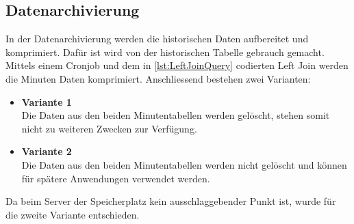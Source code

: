 \subsection{Datenarchivierung}

In der Datenarchivierung werden die historischen Daten aufbereitet und komprimiert. Dafür ist wird von der historischen Tabelle gebrauch gemacht. Mittels einem Cronjob und dem in \ref{lst:LeftJoinQuery} codierten Left Join werden die Minuten Daten komprimiert. Anschliessend bestehen zwei Varianten:\\
\begin{itemize}
\item \textbf{Variante 1}\\
Die Daten aus den beiden Minutentabellen werden gelöscht, stehen somit nicht zu weiteren Zwecken zur Verfügung.
\item \textbf{Variante 2}\\
Die Daten aus den beiden Minutentabellen werden nicht gelöscht und können für spätere Anwendungen verwendet werden.
\end{itemize}

Da beim Server der Speicherplatz kein ausschlaggebender Punkt ist, wurde für die zweite Variante entschieden. 


